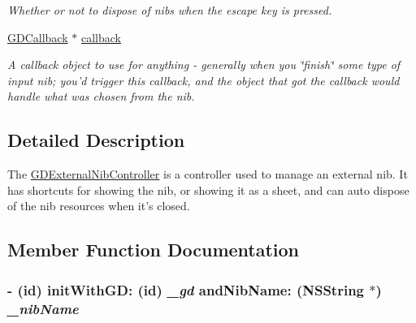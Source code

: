 \begin{DoxyCompactItemize}
\begin{DoxyCompactList}\small\item\em Whether or not to dispose of nibs when the escape key is pressed. \item\end{DoxyCompactList}\item 
\hypertarget{interface_g_d_external_nib_controller_a0168e63238b0e749c720ef096ef2eb9f}{
\hyperlink{interface_g_d_callback}{GDCallback} $\ast$ \hyperlink{interface_g_d_external_nib_controller_a0168e63238b0e749c720ef096ef2eb9f}{callback}}
\label{interface_g_d_external_nib_controller_a0168e63238b0e749c720ef096ef2eb9f}

\begin{DoxyCompactList}\small\item\em A callback object to use for anything -\/ generally when you \char`\"{}finish\char`\"{} some type of input nib; you'd trigger this callback, and the object that got the callback would handle what was chosen from the nib. \item\end{DoxyCompactList}\end{DoxyCompactItemize}


\subsection{Detailed Description}
The \hyperlink{interface_g_d_external_nib_controller}{GDExternalNibController} is a controller used to manage an external nib. It has shortcuts for showing the nib, or showing it as a sheet, and can auto dispose of the nib resources when it's closed. 

\subsection{Member Function Documentation}
\hypertarget{interface_g_d_external_nib_controller_aa8f4b18ce32d633eaa55944b497161f3}{
\subsubsection[{initWithGD:andNibName:}]{\setlength{\rightskip}{0pt plus 5cm}-\/ (id) initWithGD: (id) {\em \_\-gd}\/ andNibName: ({\bf NSString} $\ast$) {\em \_\-nibName}}}
\label{interface_g_d_external_nib_controller_aa8f4b18ce32d633eaa55944b497161f3}


